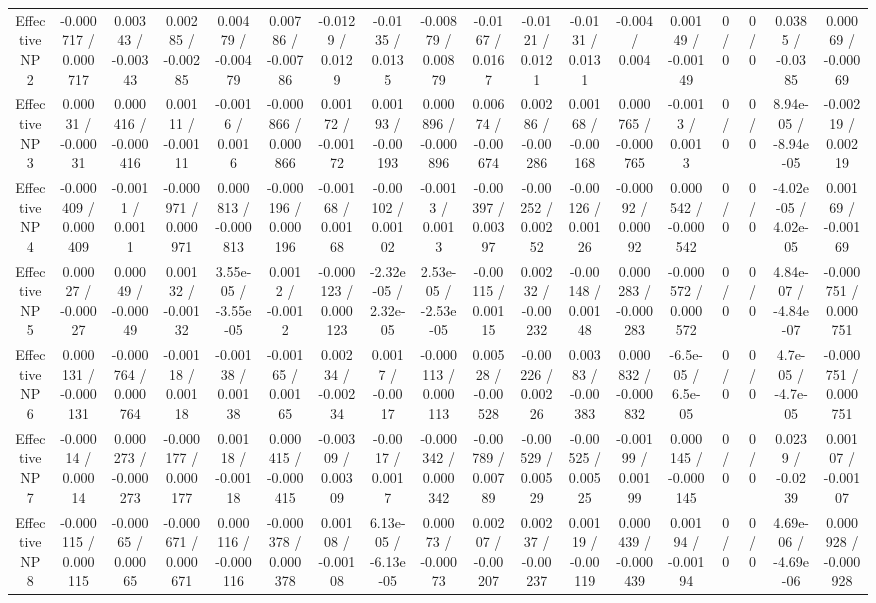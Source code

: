\documentclass[10pt]{article}
\begin{document}
\begin{table}[htbp]
\begin{center}
\begin{tabular}{|c|c|c|c|c|c|c|c|c|c|c|c|c|c|c|c|c|c|}
  Effective NP 2 & -0.000717 / 0.000717 & 0.00343 / -0.00343 & 0.00285 / -0.00285 & 0.00479 / -0.00479 & 0.00786 / -0.00786 & -0.0129 / 0.0129 & -0.0135 / 0.0135 & -0.00879 / 0.00879 & -0.0167 / 0.0167 & -0.0121 / 0.0121 & -0.0131 / 0.0131 & -0.004 / 0.004 & 0.00149 / -0.00149 & 0 / 0 & 0 / 0 & 0.0385 / -0.0385 & 0.00069 / -0.00069 \\ 
  Effective NP 3 & 0.00031 / -0.00031 & 0.000416 / -0.000416 & 0.00111 / -0.00111 & -0.0016 / 0.0016 & -0.000866 / 0.000866 & 0.00172 / -0.00172 & 0.00193 / -0.00193 & 0.000896 / -0.000896 & 0.00674 / -0.00674 & 0.00286 / -0.00286 & 0.00168 / -0.00168 & 0.000765 / -0.000765 & -0.0013 / 0.0013 & 0 / 0 & 0 / 0 & 8.94e-05 / -8.94e-05 & -0.00219 / 0.00219 \\ 
  Effective NP 4 & -0.000409 / 0.000409 & -0.0011 / 0.0011 & -0.000971 / 0.000971 & 0.000813 / -0.000813 & -0.000196 / 0.000196 & -0.00168 / 0.00168 & -0.00102 / 0.00102 & -0.0013 / 0.0013 & -0.00397 / 0.00397 & -0.00252 / 0.00252 & -0.00126 / 0.00126 & -0.00092 / 0.00092 & 0.000542 / -0.000542 & 0 / 0 & 0 / 0 & -4.02e-05 / 4.02e-05 & 0.00169 / -0.00169 \\ 
  Effective NP 5 & 0.00027 / -0.00027 & 0.00049 / -0.00049 & 0.00132 / -0.00132 & 3.55e-05 / -3.55e-05 & 0.0012 / -0.0012 & -0.000123 / 0.000123 & -2.32e-05 / 2.32e-05 & 2.53e-05 / -2.53e-05 & -0.00115 / 0.00115 & 0.00232 / -0.00232 & -0.00148 / 0.00148 & 0.000283 / -0.000283 & -0.000572 / 0.000572 & 0 / 0 & 0 / 0 & 4.84e-07 / -4.84e-07 & -0.000751 / 0.000751 \\ 
  Effective NP 6 & 0.000131 / -0.000131 & -0.000764 / 0.000764 & -0.00118 / 0.00118 & -0.00138 / 0.00138 & -0.00165 / 0.00165 & 0.00234 / -0.00234 & 0.0017 / -0.0017 & -0.000113 / 0.000113 & 0.00528 / -0.00528 & -0.00226 / 0.00226 & 0.00383 / -0.00383 & 0.000832 / -0.000832 & -6.5e-05 / 6.5e-05 & 0 / 0 & 0 / 0 & 4.7e-05 / -4.7e-05 & -0.000751 / 0.000751 \\ 
  Effective NP 7 & -0.00014 / 0.00014 & 0.000273 / -0.000273 & -0.000177 / 0.000177 & 0.00118 / -0.00118 & 0.000415 / -0.000415 & -0.00309 / 0.00309 & -0.0017 / 0.0017 & -0.000342 / 0.000342 & -0.00789 / 0.00789 & -0.00529 / 0.00529 & -0.00525 / 0.00525 & -0.00199 / 0.00199 & 0.000145 / -0.000145 & 0 / 0 & 0 / 0 & 0.0239 / -0.0239 & 0.00107 / -0.00107 \\ 
  Effective NP 8 & -0.000115 / 0.000115 & -0.00065 / 0.00065 & -0.000671 / 0.000671 & 0.000116 / -0.000116 & -0.000378 / 0.000378 & 0.00108 / -0.00108 & 6.13e-05 / -6.13e-05 & 0.00073 / -0.00073 & 0.00207 / -0.00207 & 0.00237 / -0.00237 & 0.00119 / -0.00119 & 0.000439 / -0.000439 & 0.00194 / -0.00194 & 0 / 0 & 0 / 0 & 4.69e-06 / -4.69e-06 & 0.000928 / -0.000928 \\ 

\end{tabular}
\end{center}
\end{table}
\end{document}
